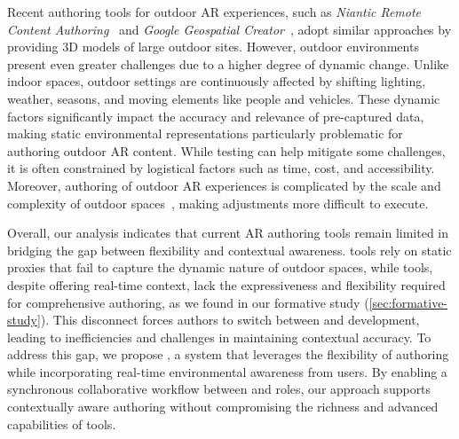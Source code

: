 Recent \exsitu authoring tools for outdoor AR experiences, such as \textit{Niantic Remote Content Authoring}~\cite{lightship-ardk-niantic} and \textit{Google Geospatial Creator}~\cite{googleGeospatialCreator}, adopt similar approaches by providing 3D models of large outdoor sites. However, outdoor environments present even greater challenges due to a higher degree of dynamic change. Unlike indoor spaces, outdoor settings are continuously affected by shifting lighting, weather, seasons, and moving elements like people and vehicles. These dynamic factors significantly impact the accuracy and relevance of pre-captured data, making static environmental representations particularly problematic for authoring outdoor AR content. While \insitu testing can help mitigate some challenges, it is often constrained by logistical factors such as time, cost, and accessibility. Moreover, \insitu authoring of outdoor AR experiences is complicated by the scale and complexity of outdoor spaces~\cite{imottesjoIterativePrototypingUrban2020, numanOutdoorCollaborativeMixed2023, caoMobileAugmentedReality2023}, making \insitu adjustments more difficult to execute.

Overall, our analysis indicates that current AR authoring tools remain limited in bridging the gap between \exsitu flexibility and \insitu contextual awareness. \Exsitu tools rely on static proxies that fail to capture the dynamic nature of outdoor spaces, while \insitu tools, despite offering real-time context, lack the expressiveness and flexibility required for comprehensive authoring, as we found in our formative study (\cref{sec:formative-study}). This disconnect forces authors to switch between \exsitu and \insitu development, leading to inefficiencies and challenges in maintaining contextual accuracy. To address this gap, we propose \SystemName, a system that leverages the flexibility of \exsitu authoring while incorporating real-time environmental awareness from \insitu users. By enabling a synchronous collaborative workflow between \exsitu and \insitu roles, our approach supports contextually aware authoring without compromising the richness and advanced capabilities of \exsitu tools.

